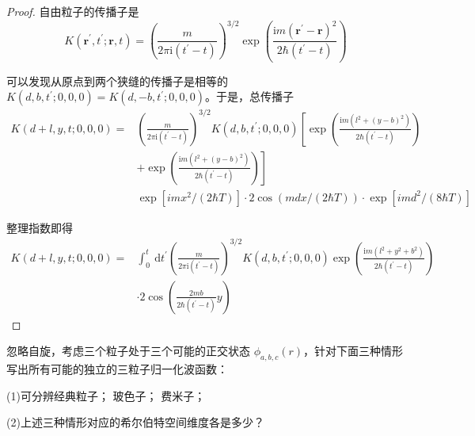 \begin{proof}
自由粒子的传播子是
$$K(\mathbf{r}^{\prime}, t^{\prime} ; \mathbf{r}, t)
=\left(\frac{m}{2 \pi \mathrm{i}\left(t^{\prime}-t\right)}\right)^{3/2} 
\exp \left(\frac{\mathrm{i} m(\mathbf{r}^{\prime}-\mathbf{r})^{2}}{2 \hbar\left(t^{\prime}-t\right)}\right)$$

可以发现从原点到两个狭缝的传播子是相等的 $K(d, b, t^{\prime} ; 0,0,0)=K(d,-b, t^{\prime} ; 0,0,0)$。于是，总传播子
$$\begin{aligned}
K(d+l, y, t ; 0,0,0)= & \left(\frac{m}{2 \pi \mathrm{i}\left(t^{\prime}-t\right)}\right)^{3/2} K(d, b, t^{\prime} ; 0,0,0)\left[\exp \left(\frac{\mathrm{i} m\left(l^{2}+(y-b)^{2}\right)}{2 \hbar\left(t^{\prime}-t\right)}\right)\right. \\
& \left.+\exp \left(\frac{\mathrm{i} m\left(l^{2}+(y-b)^{2}\right)}{2 \hbar\left(t^{\prime}-t\right)}\right)\right] \\
& \exp \left[i m x^{2} /(2 \hbar T)\right] \cdot 2 \cos (m d x /(2 \hbar T)) \cdot \exp \left[i m d^{2} /(8 \hbar T)\right]
\end{aligned}$$

整理指数即得
$$\begin{aligned}
K(d+l, y, t ; 0,0,0)= & \int_{0}^{t} \mathrm{~d} t^{\prime}\left(\frac{m}{2 \pi \mathrm{i}\left(t^{\prime}-t\right)}\right)^{3/2} 
K(d, b, t^{\prime} ; 0,0,0) \exp \left(\frac{\mathrm{i} m\left(l^{2}+y^{2}+b^{2}\right)}{2 \hbar\left(t^{\prime}-t\right)}\right) \\
& \cdot 2 \cos \left(\frac{2mb}{2 \hbar\left(t^{\prime}-t\right)} y\right)
\end{aligned}$$
\end{proof}
\begin{2}
    忽略自旋，考虑三个粒子处于三个可能的正交状态 $\phi_{a, b, c}(r)$，针对下面三种情形
写出所有可能的独立的三粒子归一化波函数：

(1)可分辨经典粒子；
玻色子；
费米子；

(2)上述三种情形对应的希尔伯特空间维度各是多少？
\end{2}
